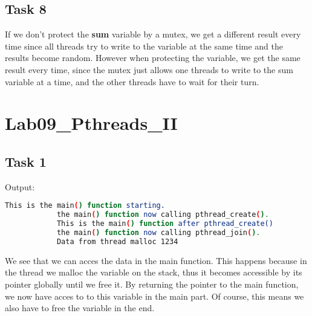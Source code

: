 \documentclass[a4paper]{scrartcl}
\begin{document}
    \subsection{Task 8}
        If we don't protect the \textbf{sum} variable by a mutex, we get a
        different result every time since all threads try to write to the
        variable at the same time and the results become random. However when
        protecting the variable, we get the same result every time, since the
        mutex just allows one threads to write to the sum variable at a time,
        and the other threads have to wait for their turn.

\section{Lab09\_Pthreads\_II}
    
    \subsection{Task 1}
        Output:
        \begin{lstlisting}[language=bash]
            This is the main() function starting.
            the main() function now calling pthread_create().
            This is the main() function after pthread_create()
            the main() function now calling pthread_join().
            Data from thread malloc 1234
        \end{lstlisting}
        We see that we can acces the data in the main function. This happens
        because in the thread we malloc the variable on the stack, thus it
        becomes accessible by its pointer globally until we free it. By
        returning the pointer to the main function, we now have acces to to this
        variable in the main part. Of course, this means we also have to free
        the variable in the end.
\end{document}
